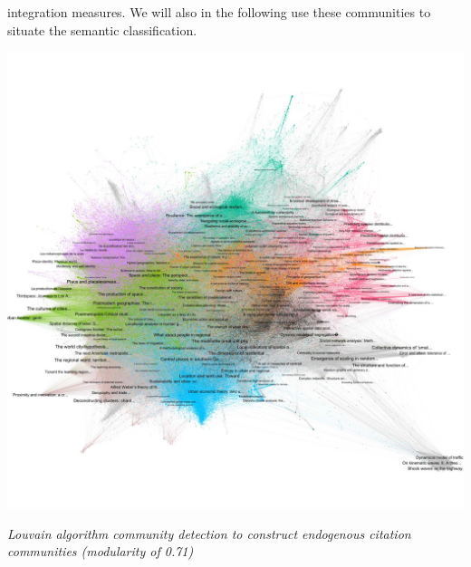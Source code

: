 {integration measures. We will also in the following use these communities to situate the semantic classification.


\begin{center}
\includegraphics[width=\textwidth,height=0.7\textheight,trim=0 0 0 2cm]{figures/Fig5.jpg}
\end{center}

\footnotesize
\textit{Louvain algorithm community detection to construct endogenous citation communities (modularity of 0.71)}

}



